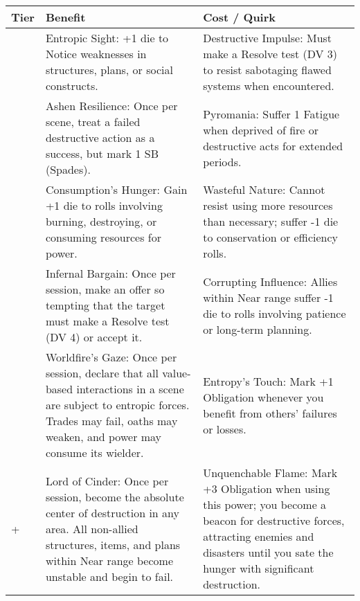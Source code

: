 \begin{longtable}{>{\raggedright\arraybackslash}p{1cm} p{5cm} p{5cm}}
\toprule
\textbf{Tier} & \textbf{Benefit} & \textbf{Cost / Quirk} \\
\midrule
1 & Entropic Sight: +1 die to Notice weaknesses in structures, plans, or social constructs. & Destructive Impulse: Must make a Resolve test (DV 3) to resist sabotaging flawed systems when encountered. \\
\midrule
2 & Ashen Resilience: Once per scene, treat a failed destructive action as a success, but mark 1 SB (Spades). & Pyromania: Suffer 1 Fatigue when deprived of fire or destructive acts for extended periods. \\
\midrule
3 & Consumption's Hunger: Gain +1 die to rolls involving burning, destroying, or consuming resources for power. & Wasteful Nature: Cannot resist using more resources than necessary; suffer -1 die to conservation or efficiency rolls. \\
\midrule
4 & Infernal Bargain: Once per session, make an offer so tempting that the target must make a Resolve test (DV 4) or accept it. & Corrupting Influence: Allies within Near range suffer -1 die to rolls involving patience or long-term planning. \\
\midrule
5 & Worldfire's Gaze: Once per session, declare that all value-based interactions in a scene are subject to entropic forces. Trades may fail, oaths may weaken, and power may consume its wielder. & Entropy's Touch: Mark +1 Obligation whenever you benefit from others' failures or losses. \\
\midrule
6+ & Lord of Cinder: Once per session, become the absolute center of destruction in any area. All non-allied structures, items, and plans within Near range become unstable and begin to fail. & Unquenchable Flame: Mark +3 Obligation when using this power; you become a beacon for destructive forces, attracting enemies and disasters until you sate the hunger with significant destruction. \\
\bottomrule
\end{longtable}